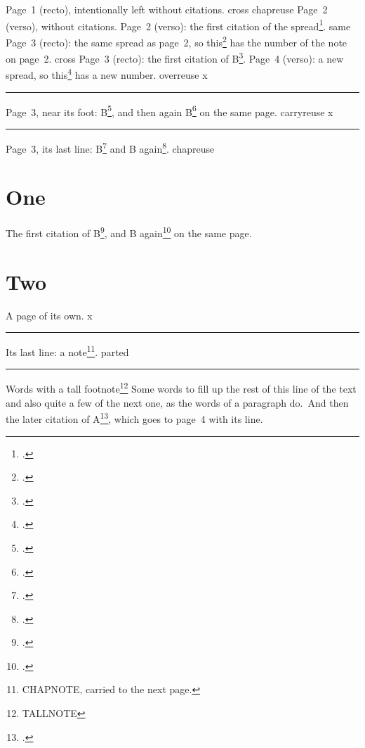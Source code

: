 \documentclass[twoside]{\testclass}
\def\same{same}\def\cross{cross}\def\parted{parted}
\def\overreuse{overreuse}
\def\carryreuse{carryreuse}\def\chapreuse{chapreuse}
\newcommand\filler{Some words to fill up the rest of this line of the text and
  also quite a few of the next one, as the words of a paragraph do.}
\begin{document}
\ifdefined\testsatfoot\footnotesatfoot\fi
Page~1 (recto), intentionally left without citations.
\newpage
\ifx\testcase\cross\def\testnotwo{}\fi
\ifx\testcase\chapreuse\def\testnotwo{}\fi
\ifdefined\testnotwo
  Page~2 (verso), without citations.
\else
  Page~2 (verso): the first citation of the spread\footcite{A}.
\fi
\newpage
\ifx\testcase\same
  Page~3 (recto): the same spread as page~2, so this\footcite{A} has the number
  of the note on page~2.
\fi
\ifx\testcase\cross
  Page~3 (recto): the first citation of B\footcite{B}.
  \newpage
  Page~4 (verso): a new spread, so this\footcite{B} has a new number.
\fi
\ifx\testcase\overreuse
  \noindent x\marginpar{\rule{1pt}{.98\textheight}}%
  \par\noindent\rule{1cm}{\dimexpr{}\baselineskip\relax}\par
  Page~3, near its foot: B\footcite{B}, and then again B\footcite{B} on the
  same page.
\fi
\ifx\testcase\carryreuse
  \noindent x\marginpar{\rule{1pt}{1.01\textheight}}%
  \par\noindent\rule{1cm}{\dimexpr{}\baselineskip\relax}\par
  Page~3, its last line: B\footcite{B} and B again\footcite{B}.
\fi
\ifx\testcase\chapreuse
  \chapter{One}
  The first citation of B\footcite{B}, and B again\footcite{B} on the same
  page.
  \chapter{Two}
  A page of its own.
  \newpage
  \noindent x\marginpar{\rule{1pt}{1.01\textheight}}%
  \par\noindent\rule{1cm}{\dimexpr{}\baselineskip\relax}\par
  Its last line: a note\footnote{CHAPNOTE, carried to the next page.}.
\fi
\ifx\testcase\parted
  \noindent\rule{1cm}{\dimexpr{}\baselineskip\relax}\par
  Words with a tall footnote\footnote{TALLNOTE\rule{0pt}{8\baselineskip}}
  \filler\ And then the later citation of A\footcite{A}, which goes to page~4
  with its line.
\fi
\end{document}
